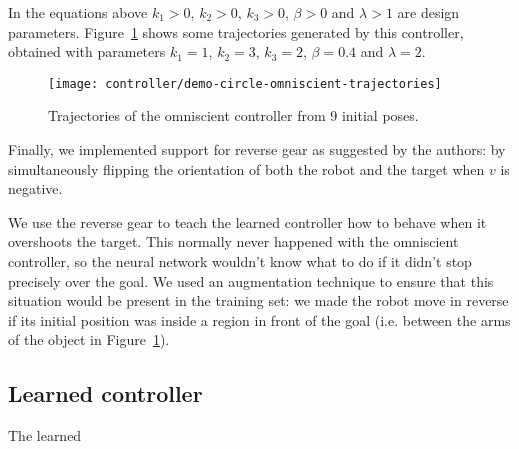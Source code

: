 In the equations above $k_1 > 0$, $k_2 > 0$, $k_3 > 0$, $\beta > 0$ and $\lambda > 1$ are design parameters. Figure~\ref{fig:omniscient-trajectories} shows some trajectories generated by this controller, obtained with parameters $k_1 = 1$, $k_2 = 3$, $k_3 = 2$, $\beta = 0.4$ and $\lambda = 2$.

\begin{figure}[htbp]
	\centerline{\texttt{[image: controller/demo-circle-omniscient-trajectories]}}
	\caption{Trajectories of the omniscient controller from 9 initial poses.}
	\label{fig:omniscient-trajectories}
\end{figure}

Finally, we implemented support for reverse gear as suggested by the authors: by simultaneously flipping the orientation of both the robot and the target when $v$ is negative. 

We use the reverse gear to teach the learned controller how to behave when it overshoots the target. This normally never happened with the omniscient controller, so the neural network wouldn't know what to do if it didn't stop precisely over the goal. We used an augmentation technique to ensure that this situation would be present in the training set: we made the robot move in reverse if its initial position was inside a region in front of the goal (i.e. between the arms of the object in Figure~\ref{fig:omniscient-trajectories}).

\subsection{Learned controller}

The learned 
